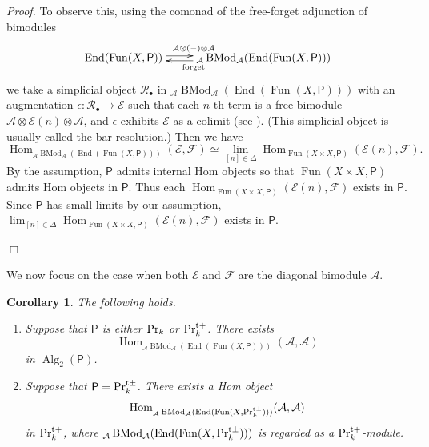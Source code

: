 \documentclass[leqno,12pt]{amsart}
\theoremstyle{plain}
\newtheorem{Corollary}[Theorem]{Corollary}
\theoremstyle{definition}
\newcommand{\PR}{\textup{Pr}}
\newcommand{\PRTT}{\textup{Pr}^{\textup{t}+}}
\newcommand{\PRTTT}{\textup{Pr}^{\textup{t}\pm}}
\newcommand{\Hom}{\operatorname{Hom}}
\newcommand{\Fun}{\operatorname{Fun}}
\newcommand{\Alg}{\operatorname{Alg}}
\newcommand{\End}{\operatorname{End}}
\newcommand{\BMod}{\operatorname{BMod}}
\newcommand{\Proof}{{\sl Proof.}\quad}
\newcommand{\QED}{{\unskip\nobreak\hfil\penalty50\quad\null\nobreak\hfil
{$\Box$}\parfillskip0pt\finalhyphendemerits0\par\medskip}}
\begin{document}
\Proof
To observe this, using the comonad of the free-forget adjunction of bimodules
\[
\xymatrix{
\End(\Fun(X,\mathsf{P})) \ar@<0.5ex>[r]^{\mathcal{A}\otimes(-)\otimes\mathcal{A}}  &  {}_{\mathcal{A}}\BMod_{\mathcal{A}}(\End(\Fun(X,\mathsf{P})))   \ar@<0.5ex>[l]^{\textup{forget}}  
}
\]
we take a simplicial object $\mathcal{R}_\bullet$ in ${}_{\mathcal{A}}\BMod_{\mathcal{A}}(\End(\Fun(X,\mathsf{P})))$ with an augmentation $\epsilon:\mathcal{R}_\bullet\to \mathcal{E}$ 
such that each $n$-th term is a free bimodule $\mathcal{A}\otimes \mathcal{E}(n)\otimes \mathcal{A}$,
and $\epsilon$ exhibits $\mathcal{E}$ as a colimit (see \cite[Proposition 4.7.3.14, 4.7.3.13]{HA}).
(This simplicial object is usually called the bar resolution.) 
Then we have
\[
\Hom_{{}_{\mathcal{A}}\BMod_{\mathcal{A}}(\End(\Fun(X,\mathsf{P})))}(\mathcal{E},\mathcal{F})\simeq \lim_{[n]\in \Delta}\Hom_{\Fun(X\times X,\mathsf{P})}( \mathcal{E}(n),\mathcal{F}).
\]
By the assumption, $\mathsf{P}$ admits internal Hom objects so that
$\Fun(X\times X,\mathsf{P})$ admits Hom objects in $\mathsf{P}$.
Thus each $\Hom_{\Fun(X\times X,\mathsf{P})}( \mathcal{E}(n),\mathcal{F})$ exists in $\mathsf{P}$.
Since
$\mathsf{P}$ has small limits by our assumption, $\lim_{[n]\in \Delta}\Hom_{\Fun(X\times X,\mathsf{P})}( \mathcal{E}(n),\mathcal{F})$ exists in $\mathsf{P}$.
\QED


We now focus on the case when both $\mathcal{E}$ and $\mathcal{F}$ are the diagonal bimodule $\mathcal{A}$.


\begin{Corollary}
\label{bimoduleexist}
The following holds.
\begin{enumerate}

\item
Suppose that $\mathsf{P}$ is either $\PR_k$ or $\PRTT_k$.
There exists 
\[
\Hom_{{}_{\mathcal{A}}\BMod_{\mathcal{A}}(\End(\Fun(X,\mathsf{P})))}(\mathcal{A},\mathcal{A})
\]
in $\Alg_2(\mathsf{P})$.

\item
Suppose that $\mathsf{P}=\PRTTT_k$.
There exists a Hom object  
\[
\Hom_{{}_{\mathcal{A}}\BMod_{\mathcal{A}}(\End(\Fun(X,\PRTTT_k)))}(\mathcal{A},\mathcal{A})
\]
in $\PRTT_k$, where ${}_{\mathcal{A}}\BMod_{\mathcal{A}}(\End(\Fun(X,\PRTTT_k)))$ is regarded as a $\PRTT_k$-module.
\end{enumerate}
\end{Corollary}
\end{document}
